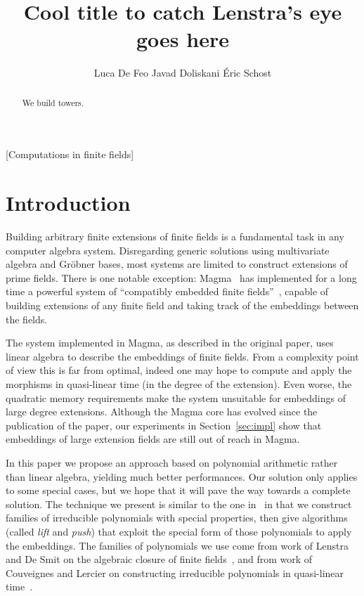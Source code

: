 \documentclass{sig-alternate}
\begin{document}
\title{Cool title to catch Lenstra's eye goes here}
\author{
  \alignauthor Luca De Feo
  \alignauthor Javad Doliskani
  \alignauthor Éric Schost
}

\maketitle
\begin{abstract}
  We build towers.
\end{abstract}
[Computations in finite fields]


\section{Introduction}
\label{sec:intro}

Building arbitrary finite extensions of finite fields is a fundamental
task in any computer algebra system. Disregarding generic solutions
using multivariate algebra and Gröbner bases, most systems are limited
to construct extensions of prime fields. There is one notable
exception: Magma~\cite{MAGMA} has implemented for a long time a
powerful system of ``compatibly embedded finite
fields''~\cite{bosma+cannon+steel97}, capable of building extensions
of any finite field and taking track of the embeddings between the
fields.

The system implemented in Magma, as described in the original paper,
uses linear algebra to describe the embeddings of finite fields. From
a complexity point of view this is far from optimal, indeed one may
hope to compute and apply the morphisms in quasi-linear time (in the
degree of the extension). Even worse, the quadratic memory
requirements make the system unsuitable for embeddings of large degree
extensions. Although the Magma core has evolved since the publication
of the paper, our experiments in Section~\ref{sec:impl} show that
embeddings of large extension fields are still out of reach in Magma.

In this paper we propose an approach based on polynomial arithmetic
rather than linear algebra, yielding much better performances. Our
solution only applies to some special cases, but we hope that it will
pave the way towards a complete solution. The technique we present is
similar to the one in~\cite{df+schost12} in that we construct families
of irreducible polynomials with special properties, then give
algorithms (called \emph{lift} and \emph{push}) that exploit the
special form of those polynomials to apply the embeddings. The
families of polynomials we use come from work of Lenstra and De Smit
on the algebraic closure of finite
fields~\cite{lenstra+desmit08-stdmodels}, and from work of Couveignes
and Lercier on constructing irreducible polynomials in quasi-linear
time~\cite{couveignes+lercier11}.
\end{document}
